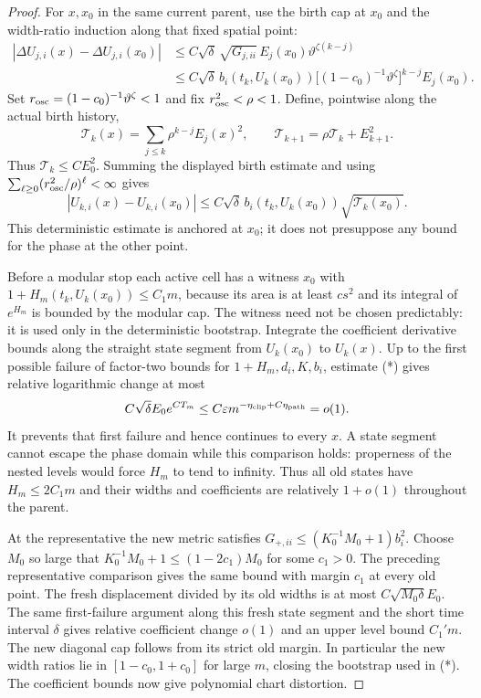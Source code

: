 \documentclass[11pt]{article}
\numberwithin{equation}{section}
\begin{document}
\begin{proof}
For $x,x_0$ in the same current parent, use the birth cap at $x_0$
and the width-ratio induction along that fixed spatial point:
\[
 \begin{split}
 |\Delta U_{j,i}(x)-\Delta U_{j,i}(x_0)|
 &\le C\sqrt\delta\,\sqrt{G_{j,ii}}\,E_j(x_0)
                     \vartheta^{\zeta(k-j)}\\
 &\le C\sqrt\delta\,b_i(t_k,U_k(x_0))
       \bigl[(1-c_0)^{-1}\vartheta^\zeta\bigr]^{k-j}E_j(x_0).
 \end{split}
\]
Set $r_{\rm osc}=(1-c_0)^{-1}\vartheta^\zeta<1$ and fix
$r_{\rm osc}^2<\rho<1$. Define, pointwise along the actual birth
history,
\[
 \mathcal T_k(x)=\sum_{j\le k}\rho^{k-j}E_j(x)^2,
 \qquad \mathcal T_{k+1}=\rho\mathcal T_k+E_{k+1}^2.
\]
Thus $\mathcal T_k\le CE_0^2$. Summing the displayed birth estimate
and using
$\sum_{\ell\ge0}(r_{\rm osc}^2/\rho)^\ell<\infty$ gives
\[
 |U_{k,i}(x)-U_{k,i}(x_0)|
 \le C\sqrt\delta\,b_i(t_k,U_k(x_0))
                         \sqrt{\mathcal T_k(x_0)}.                 \tag{*}
\]
This deterministic estimate is anchored at $x_0$; it does not
presuppose any bound for the phase at the other point.

Before a modular stop each active cell has a witness $x_0$ with
$1+H_m(t_k,U_k(x_0))\le C_1m$, because its area is at least $cs^2$
and its integral of $e^{H_m}$ is bounded by the modular cap.
The witness need not be chosen predictably: it is used only in the
deterministic bootstrap. Integrate the coefficient derivative bounds
along the straight state segment from $U_k(x_0)$ to $U_k(x)$.
Up to the first possible failure of factor-two bounds for
$1+H_m,d_i,K,b_i$, estimate (*) gives relative logarithmic change
at most
\[
 C\sqrt\delta E_0e^{CT_m}
 \le C\varepsilon m^{-\eta_{\rm clip}+C\eta_{\rm path}}=o(1).
\]
It prevents that first failure and hence continues to every $x$.
A state segment cannot escape the phase domain while this comparison
holds: properness of the nested levels would force $H_m$ to tend to
infinity. Thus all old states have $H_m\le 2C_1m$ and their widths
and coefficients are relatively $1+o(1)$ throughout the parent.

At the representative the new metric satisfies
$G_{+,ii}\le(K_0^{-1}M_0+1)b_i^2$. Choose $M_0$ so large that
$K_0^{-1}M_0+1\le(1-2c_1)M_0$ for some $c_1>0$.
The preceding representative comparison gives the same bound with
margin $c_1$ at every old point. The fresh displacement divided by
its old widths is at most $C\sqrt{M_0\delta}E_0$.
The same first-failure argument along this fresh state segment and
the short time interval $\delta$ gives relative coefficient change
$o(1)$ and an upper level bound $C_1'm$. The new diagonal cap follows
from its strict old margin. In particular the new width ratios lie
in $[1-c_0,1+c_0]$ for large $m$, closing the bootstrap used in (*).
The coefficient bounds now give polynomial chart distortion.


\end{proof}
\end{document}
